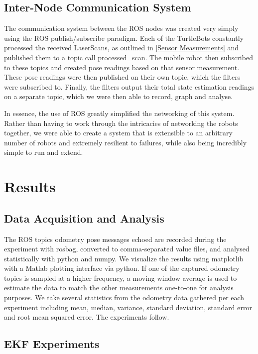 \documentclass[conference]{IEEEtran} \usepackage[T1]{fontenc} \usepackage[backend=biber, style=ieee]{biblatex}
\begin{document}
\subsection{Inter-Node Communication System} \label{Inter-Node Communication System} The communication system between
the ROS nodes was created very simply using the ROS publish/subscribe paradigm. Each of the TurtleBots constantly
processed the received LaserScans, as outlined in \ref{Sensor Measurements} and published them to a topic call
processed\_scan. The mobile robot then subscribed to these topics and created pose readings based on that sensor
measurement. These pose readings were then published on their own topic, which the filters were subscribed to. 
Finally, the filters output their total state estimation readings on a separate topic, which we were then able to
record, graph and analyse.

In essence, the use of ROS greatly simplified the networking of this system. Rather than having to work through the
intricacies of networking the robots together, we were able to create a system that is extensible to an arbitrary number
of robots and extremely resilient to failures, while also being incredibly simple to run and extend.

\section{Results} \label{Results} %
\subsection{Data Acquisition and Analysis} \label{Data Acquisition and Analysis}
The ROS topics odometry pose messages echoed are 
recorded during the experiment with rosbag, converted to comma-separated value files, and analysed statistically with 
python and numpy. We visualize the results using matplotlib with a Matlab plotting interface via python. If one of the 
captured odometry topics is sampled at a higher frequency, a moving window average is used to estimate the data to match 
the other measurements one-to-one for analysis purposes. We take several statistics from the odometry data gathered per each experiment 
including mean, median, variance, standard deviation, standard error and root mean squared error. The 
experiments follow. 

\subsection{EKF Experiments} \label{EKF Experiments}
\end{document}
